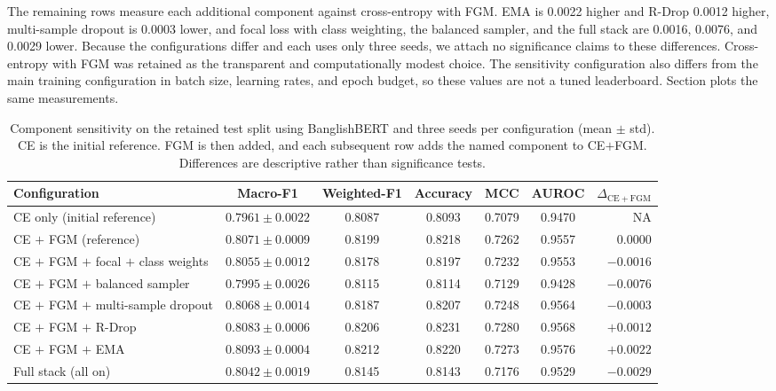 \documentclass[11pt,a4paper]{article}
\def\Cref#1{Section}%
\begin{document}
The remaining rows measure each additional component against cross-entropy with FGM. EMA is 0.0022 higher and R-Drop 0.0012 higher, multi-sample dropout is 0.0003 lower, and focal loss with class weighting, the balanced sampler, and the full stack are 0.0016, 0.0076, and 0.0029 lower. Because the configurations differ and each uses only three seeds, we attach no significance claims to these differences. Cross-entropy with FGM was retained as the transparent and computationally modest choice. The sensitivity configuration also differs from the main training configuration in batch size, learning rates, and epoch budget, so these values are not a tuned leaderboard. \Cref{fig:ablation} plots the same measurements.

\begin{table}[!htbp]
\centering
\caption{Component sensitivity on the retained test split using BanglishBERT and three seeds per configuration (mean $\pm$ std). CE is the initial reference. FGM is then added, and each subsequent row adds the named component to CE$+$FGM. Differences are descriptive rather than significance tests.}
\label{tab:component}
\small
\begin{tabular}{@{}lcccccr@{}}
\toprule
\textbf{Configuration} & \textbf{Macro-F1} & \textbf{Weighted-F1} & \textbf{Accuracy} & \textbf{MCC} & \textbf{AUROC} & \textbf{$\Delta_{\mathrm{CE+FGM}}$} \\
\midrule
CE only (initial reference) & $0.7961 \pm 0.0022$ & 0.8087 & 0.8093 & 0.7079 & 0.9470 & NA \\
CE $+$ FGM (reference) & $0.8071 \pm 0.0009$ & 0.8199 & 0.8218 & 0.7262 & 0.9557 & $0.0000$ \\
CE $+$ FGM $+$ focal $+$ class weights & $0.8055 \pm 0.0012$ & 0.8178 & 0.8197 & 0.7232 & 0.9553 & $-0.0016$ \\
CE $+$ FGM $+$ balanced sampler & $0.7995 \pm 0.0026$ & 0.8115 & 0.8114 & 0.7129 & 0.9428 & $-0.0076$ \\
CE $+$ FGM $+$ multi-sample dropout & $0.8068 \pm 0.0014$ & 0.8187 & 0.8207 & 0.7248 & 0.9564 & $-0.0003$ \\
CE $+$ FGM $+$ R-Drop & $0.8083 \pm 0.0006$ & 0.8206 & 0.8231 & 0.7280 & 0.9568 & $+0.0012$ \\
CE $+$ FGM $+$ EMA & $\mathbf{0.8093 \pm 0.0004}$ & 0.8212 & 0.8220 & 0.7273 & 0.9576 & $+0.0022$ \\
Full stack (all on) & $0.8042 \pm 0.0019$ & 0.8145 & 0.8143 & 0.7176 & 0.9529 & $-0.0029$ \\
\bottomrule
\end{tabular}
\end{table}
\end{document}
